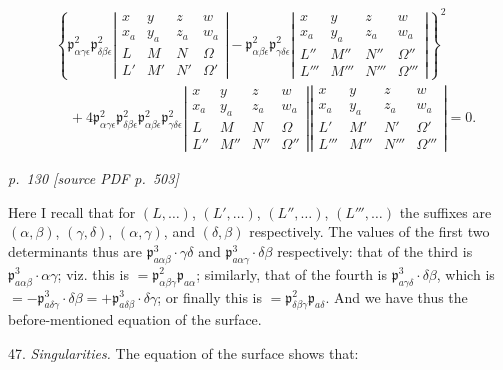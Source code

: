 \documentclass[11pt,a4paper]{article}
\newcommand{\sourcepage}[2]{%
  \bigskip
  \noindent\textit{p.~#1 [source PDF p.~#2]}%
  \par\smallskip
}
\newcommand{\p}{\mathfrak p}
\begin{document}
\[
\begin{aligned}
&\left\{\p^2_{\alpha\gamma\epsilon}\p^2_{\delta\beta\epsilon}
\left|\begin{array}{cccc}
x&y&z&w\\
x_a&y_a&z_a&w_a\\
L&M&N&\Omega\\
L'&M'&N'&\Omega'
\end{array}\right|
-\p^2_{\alpha\beta\epsilon}\p^2_{\gamma\delta\epsilon}
\left|\begin{array}{cccc}
x&y&z&w\\
x_a&y_a&z_a&w_a\\
L''&M''&N''&\Omega''\\
L'''&M'''&N'''&\Omega'''
\end{array}\right|\right\}^2\\
&\quad
+4\p^2_{\alpha\gamma\epsilon}\p^2_{\delta\beta\epsilon}
\p^2_{\alpha\beta\epsilon}\p^2_{\gamma\delta\epsilon}
\left|\begin{array}{cccc}
x&y&z&w\\
x_a&y_a&z_a&w_a\\
L&M&N&\Omega\\
L''&M''&N''&\Omega''
\end{array}\right|
\left|\begin{array}{cccc}
x&y&z&w\\
x_a&y_a&z_a&w_a\\
L'&M'&N'&\Omega'\\
L'''&M'''&N'''&\Omega'''
\end{array}\right|=0.
\end{aligned}
\]

\sourcepage{130}{503}
Here I recall that for $(L,\ldots)$, $(L',\ldots)$, $(L'',\ldots)$,
$(L''',\ldots)$ the suffixes are $(\alpha,\beta)$, $(\gamma,\delta)$,
$(\alpha,\gamma)$, and $(\delta,\beta)$ respectively. The values of the first two
determinants thus are $\p^3_{a\alpha\beta}\cdot\gamma\delta$ and
$\p^3_{a\alpha\gamma}\cdot\delta\beta$ respectively: that of the third is
$\p^3_{a\alpha\beta}\cdot\alpha\gamma$; viz. this is
$=\p^2_{\alpha\beta\gamma}\p_{a\alpha}$; similarly, that of the fourth is
$\p^3_{a\gamma\delta}\cdot\delta\beta$, which is
$=-\p^3_{a\delta\gamma}\cdot\delta\beta=+\p^3_{a\delta\beta}\cdot\delta\gamma$;
or finally this is $=\p^2_{\delta\beta\gamma}\p_{a\delta}$. And we have thus the
before-mentioned equation of the surface.

47. \textit{Singularities.} The equation of the surface shows that:
\end{document}
